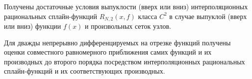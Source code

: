 Получены достаточные условия выпуклости (вверх или вниз) интерполяционных рациональных сплайн-функций $R_{N,2}(x,f)$  класса $C^2$ в случае выпуклой (вверх или вниз) функции $f(x)$ и произвольных сеток узлов.

Для дважды непрерывно дифференцируемых на отрезке функций получены оценки совместного   равномерного приближения самих функций и их производных до второго порядка посредством интерполяционных рациональных сплайн-функций и их соответствующих производных.







%





